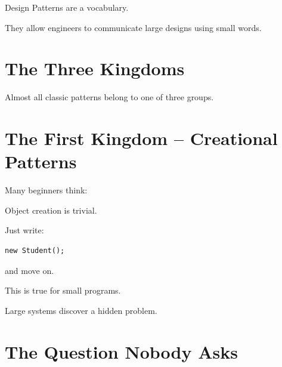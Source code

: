 \documentclass[11pt,a4paper]{book}
\begin{document}

\begin{idea}

Design Patterns are a vocabulary.


They allow engineers to
communicate large designs
using small words.

\end{idea}


\section{The Three Kingdoms}

Almost all classic patterns
belong to one of three groups.
\section{The First Kingdom -- Creational Patterns}

\begin{trap}

Many beginners think:


Object creation is trivial.


Just write:

\begin{verbatim}
new Student();
\end{verbatim}

and move on.


This is true for small programs.


Large systems discover a hidden problem.

\end{trap}


\section{The Question Nobody Asks}
\end{document}
